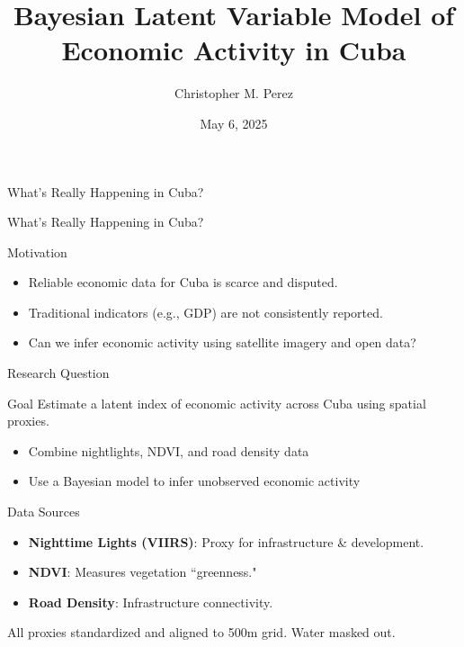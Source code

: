 \documentclass{beamer}
\title{Bayesian Latent Variable Model of Economic Activity in Cuba}
\author{Christopher M. Perez}
\date{May 6, 2025}
\begin{document}
\begin{frame}
  \titlepage
\end{frame}

\begin{frame}{What's Really Happening in Cuba?}
  \centering
   \\[1em]
\end{frame}

\begin{frame}{What's Really Happening in Cuba?}
  \centering
\end{frame}


\begin{frame}{Motivation}
\begin{itemize}
  \item Reliable economic data for Cuba is scarce and disputed.
  \item Traditional indicators (e.g., GDP) are not consistently reported.
  \item Can we infer economic activity using satellite imagery and open data?
\end{itemize}
\end{frame}

\begin{frame}{Research Question}
\begin{block}{Goal}
Estimate a latent index of economic activity across Cuba using spatial proxies.
\end{block}
\pause
\begin{itemize}
  \item Combine nightlights, NDVI, and road density data
  \item Use a Bayesian model to infer unobserved economic activity
\end{itemize}
\end{frame}

\begin{frame}{Data Sources}
\begin{itemize}
    \item \textbf{Nighttime Lights (VIIRS)}: Proxy for infrastructure \& development.
    \item \textbf{NDVI}: Measures vegetation ``greenness."
  \item \textbf{Road Density}: Infrastructure connectivity.
\end{itemize}
\pause
All proxies standardized and aligned to 500m grid. Water masked out.
\end{frame}
\end{document}
